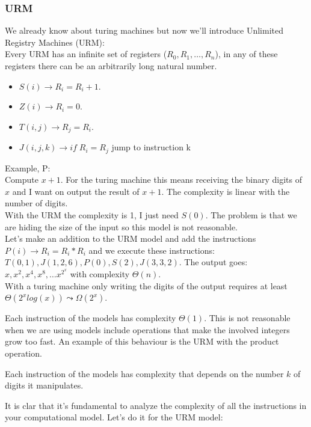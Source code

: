 \subsubsection*{URM}
We already know about turing machines but now we'll introduce Unlimited Registry Machines (URM):\\
Every URM has an infinite set of registers ($R_0, R_1, \ldots, R_n$), in any of these registers there can be an arbitrarily long natural number.
\begin{itemize}
    \item $S(i) \rightarrow R_i = R_i+1$.
    \item $Z(i) \rightarrow R_i = 0$.
    \item $T(i,j) \rightarrow R_j = R_i$.
    \item $J(i,j,k) \rightarrow if \;R_i = R_j$ jump to instruction k
\end{itemize}
Example, P:\\
Compute $x+1$. For the turing machine this means receiving the binary digits of $x$ and I want on output the result of $x+1$. The complexity is linear with the number of digits.\\
With the URM the complexity is 1, I just need $S(0)$. The problem is that we are hiding the size of the input so this model is not reasonable.\\
Let's make an addition to the URM model and add the instructions $P(i) \rightarrow R_i = R_i*R_i$ and we execute these instructions:
$T(0,1), J(1,2,6), P(0), S(2), J(3,3,2)$. The output goes: $x, x^2, x^4, x^8, \ldots x^{2^x}$ with complexity $\Theta(n)$. \\With a turing machine only writing the digits of the output requires at least $\Theta(2^xlog(x)) \leadsto \Omega(2^x) $.\\
\begin{definition}
    Each instruction of the models has complexity $\Theta(1)$. This is not reasonable when we are using models include operations that make the involved integers grow too fast. An example of this behaviour is the URM with the product operation.\\
\end{definition}
\begin{definition}
    Each instruction of the models has complexity that depends on the number $k$ of digits it manipulates.\\
\end{definition}
It is clar that it's fundamental to analyze the complexity of all the instructions in your computational model. Let's do it for the URM model:
